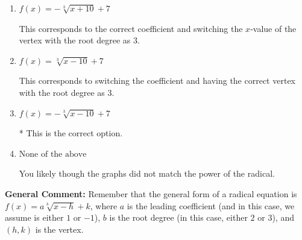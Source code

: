 \documentclass{extbook}[14pt]
\begin{document}
\begin{enumerate}
{\begin{enumerate}[label=\Alph*.]
This corresponds to switching the coefficient AND switching the $x$-value of the vertex with the root degree as $3$.
\item \( f(x) = - \sqrt[3]{x + 10} + 7 \)

This corresponds to the correct coefficient and switching the $x$-value of the vertex with the root degree as $3$.
\item \( f(x) = \sqrt[3]{x - 10} + 7 \)

This corresponds to switching the coefficient and having the correct vertex with the root degree as $3$.
\item \( f(x) = - \sqrt[3]{x - 10} + 7 \)

* This is the correct option.
\item \( \text{None of the above} \)

You likely though the graphs did not match the power of the radical.
\end{enumerate}

\textbf{General Comment:} Remember that the general form of a radical equation is $ f(x) = a \sqrt[b]{x - h} + k$, where $a$ is the leading coefficient (and in this case, we assume is either $1$ or $-1$), $b$ is the root degree (in this case, either $2$ or $3$), and $(h, k)$ is the vertex.
}
\end{enumerate}
\end{document}
